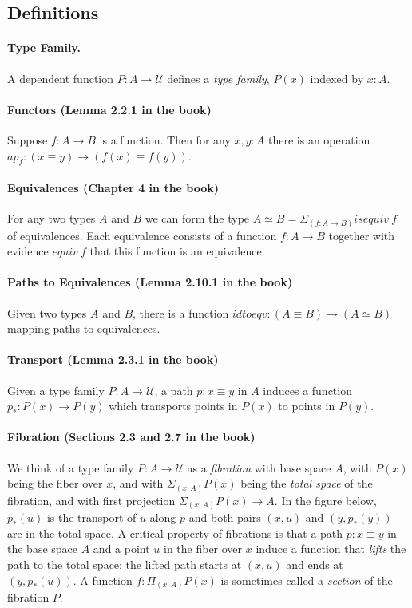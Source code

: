 \documentclass{entcs}
\begin{document}
\subsection{Definitions}

\paragraph*{Type Family.} A dependent function $P : A \to \mathcal{U}$ defines a
\emph{type family}, $P(x)$ indexed by $x:A$.

\paragraph*{Functors (Lemma 2.2.1 in the book)} Suppose $f : A \to B$ is a
function. Then for any $x,y:A$ there is an operation
$\mathit{ap}_f : (x \equiv y) \to (f(x) \equiv f(y))$.

\paragraph*{Equivalences (Chapter 4 in the book)} For any two types $A$ and $B$
we can form the type $A \simeq B = \Sigma_{(f : A \to B)} \mathit{isequiv}~f$ of
equivalences. Each equivalence consists of a function $f : A \to B$ together
with evidence $\mathit{equiv}~f$ that this function is an equivalence.

\paragraph*{Paths to Equivalences (Lemma 2.10.1 in the book)} Given two types
$A$ and $B$, there is a function
$\mathit{idtoeqv} : (A \equiv B) \to (A \simeq B)$ mapping paths to
equivalences.

\paragraph*{Transport (Lemma 2.3.1 in the book)} Given a type family
$P : A \to \mathcal{U}$, a path $p : x \equiv y$ in $A$ induces a function
$p_* : P(x) \to P(y)$ which transports points in $P(x)$ to points in $P(y)$.

\paragraph*{Fibration (Sections 2.3 and 2.7 in the book)} We think of a type
family $P : A \to \mathcal{U}$ as a \emph{fibration} with base space $A$, with
$P(x)$ being the fiber over $x$, and with $\Sigma_{(x:A)} P(x)$ being the
\emph{total space} of the fibration, and with first projection
$\Sigma_{(x:A)} P(x) \to A$. In the figure below, $p_*(u)$ is the transport of
$u$ along $p$ and both pairs $(x,u)$ and $(y,p_*(y))$ are in the total space. A
critical property of fibrations is that a path $p : x \equiv y$ in the base
space $A$ and a point $u$ in the fiber over $x$ induce a function that
\emph{lifts} the path to the total space: the lifted path starts at $(x,u)$ and
ends at $(y,p_*(u))$. A function $f : \Pi_{(x:A)} P(x)$ is sometimes called a
\emph{section} of the fibration $P$.
\end{document}
